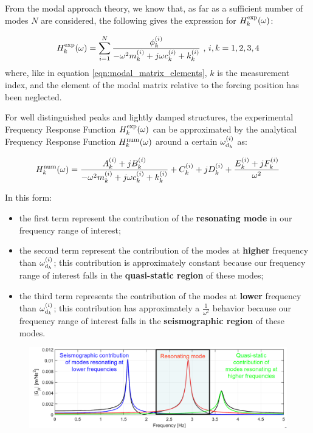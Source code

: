 \documentclass[a4paper,12pt,oneside]{article}
\begin{document}
From the modal approach theory, we know that, as far as a sufficient number of modes $ N $ are considered, the following gives the expression for $ H^\textup{exp}_k(\omega) $:

\begin{equation}
\label{eqn:Hexp_modal} 
	H^\textup{exp}_k(\omega) = \sum_{i=1}^{N} \frac{\phi_k^{(i)}}
		{-\omega^2 m^{(i)}_k + j \omega c^{(i)}_k + k^{(i)}_k}
		~ \text{,} ~ i,k = 1,2,3,4
\end{equation}
where, like in equation \eqref{eqn:modal_matrix_elements}, $ k $ is the measurement index, and the element of the modal matrix relative to the forcing position has been neglected.

For well distinguished peaks and lightly damped structures, the experimental Frequency Response Function $ H^\textup{exp}_k(\omega) $ can be approximated by the analytical Frequency Response Function $ H^\textup{num}_k(\omega) $ around a certain $ \omega_{\textup{d}_k}^{(i)} $ as:

\[	
	H^\textup{num}_k(\omega) = \frac{A^{(i)}_k + j B^{(i)}_k}
		{-\omega^2 m^{(i)}_k + j \omega c^{(i)}_k + k^{(i)}_k}
		+ C^{(i)}_k + j D^{(i)}_k
		+ \frac{E^{(i)}_k + j F^{(i)}_k}{\omega^2}
\]

In this form:

\begin{itemize}
	\item the first term represent the contribution of the \textbf{resonating mode} in our frequency range of interest;
	\item the second term represent the contribution of the modes at \textbf{higher} frequency than $ \omega_{\textup{d}_k}^{(i)} $; this contribution is approximately constant because our frequency range of interest falls in the \textbf{quasi-static region} of these modes;
	\item the third term represents the contribution of the modes at \textbf{lower} frequency than $ \omega_{\textup{d}_k}^{(i)} $; this contribution has approximately a $ \frac{1}{\omega^2} $ behavior because our frequency range of interest falls in the \textbf{seismographic region} of these modes.
\end{itemize}

\begin{figure}[H]
	\includegraphics[scale=0.4]{frf_num_regions}
\end{figure}
\end{document}
